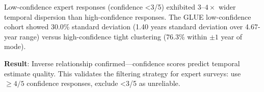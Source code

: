 
Low-confidence expert responses (confidence <3/5) exhibited 3--$4\times$ wider temporal dispersion than high-confidence responses. The GLUE low-confidence cohort showed 30.0\% standard deviation (1.40 years standard deviation over 4.67-year range) versus high-confidence tight clustering (76.3\% within $\pm 1$ year of mode).

\textbf{Result}: Inverse relationship confirmed---confidence scores predict temporal estimate quality. This validates the filtering strategy for expert surveys: use $\geq 4/5$ confidence responses, exclude <3/5 as unreliable.
